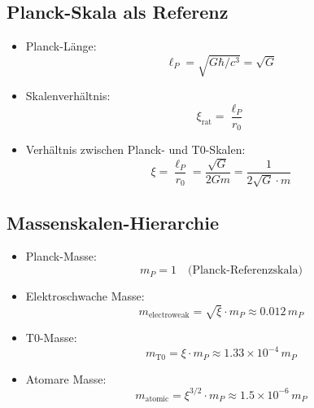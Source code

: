 \documentclass[12pt,a4paper]{article}
\begin{document}
	\subsection{Planck-Skala als Referenz}
	\begin{itemize}
		\item Planck-Länge:
		\begin{equation}
			\ell_P = \sqrt{G\hbar/c^3} = \sqrt{G}
		\end{equation}
		
		\item Skalenverhältnis:
		\begin{equation}
			\xi_{\text{rat}} = \frac{\ell_P}{r_0}
		\end{equation}
		
		\item Verhältnis zwischen Planck- und T0-Skalen:
		\begin{equation}
			\xi = \frac{\ell_P}{r_0} = \frac{\sqrt{G}}{2Gm} = \frac{1}{2\sqrt{G} \cdot m}
		\end{equation}
	\end{itemize}
	
	\subsection{Massenskalen-Hierarchie}
	\begin{itemize}
		\item Planck-Masse:
		\begin{equation}
			m_P = 1 \quad \text{(Planck-Referenzskala)}
		\end{equation}
		
		\item Elektroschwache Masse:
		\begin{equation}
			m_{\text{electroweak}} = \sqrt{\xi} \cdot m_P \approx 0.012 \, m_P
		\end{equation}
		
		\item T0-Masse:
		\begin{equation}
			m_{\text{T0}} = \xi \cdot m_P \approx 1.33 \times 10^{-4} \, m_P
		\end{equation}
		
		\item Atomare Masse:
		\begin{equation}
			m_{\text{atomic}} = \xi^{3/2} \cdot m_P \approx 1.5 \times 10^{-6} \, m_P
		\end{equation}
	\end{itemize}
	
\end{document}
